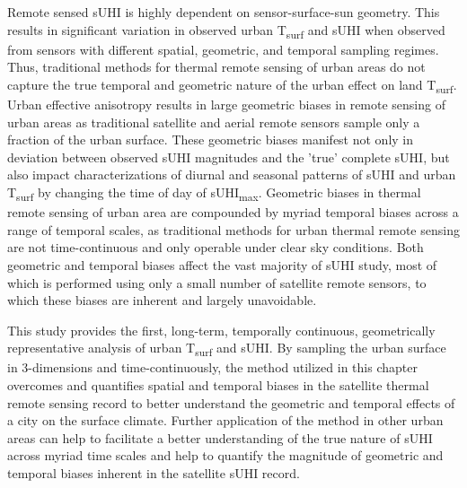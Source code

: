 \begin{bibunit}
Remote sensed sUHI is highly dependent on sensor-surface-sun geometry. This results in significant variation in observed urban T\textsubscript{surf} and sUHI when observed from sensors with different spatial, geometric, and temporal sampling regimes. Thus, traditional methods for thermal remote sensing of urban areas do not capture the true temporal and geometric nature of the urban effect on land T\textsubscript{surf}. Urban effective anisotropy results in large geometric biases in remote sensing of urban areas as traditional satellite and aerial remote sensors sample only a fraction of the urban surface. These geometric biases manifest not only in deviation between observed sUHI magnitudes and the 'true' complete sUHI, but also impact characterizations of diurnal and seasonal patterns of sUHI and urban T\textsubscript{surf} by changing the time of day of sUHI\textsubscript{max}. Geometric biases in thermal remote sensing of urban area are compounded by myriad temporal biases across a range of temporal scales, as traditional methods for urban thermal remote sensing are not time-continuous and only operable under clear sky conditions. Both geometric and temporal biases affect the vast majority of sUHI study, most of which is performed using only a small number of satellite remote sensors, to which these biases are inherent and largely unavoidable. 

This study provides the first, long-term, temporally continuous, geometrically representative analysis of urban T\textsubscript{surf} and sUHI. By sampling the urban surface in 3-dimensions and time-continuously, the method utilized in this chapter overcomes and quantifies spatial and temporal biases in the satellite thermal remote sensing record to better understand the geometric and temporal effects of a city on the surface climate. Further application of the method in other urban areas can help to facilitate a better understanding of the true nature of sUHI across myriad time scales and help to quantify the magnitude of geometric and temporal biases inherent in the satellite sUHI record.

\cleardoublepage 
{}  
\renewcommand*{\bibname}{References}


\putbib
\end{bibunit}